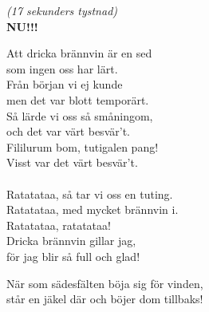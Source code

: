 \documentclass[a6paper, 10pt, twoside]{article}
\begin{document}
\noindent
\begin{center}
    \begin{lyrics}
        \textit{\small(17 sekunders tystnad)}\\
        \Large \textbf{NU!!!}
    \end{lyrics}
\end{center}
\begin{center}
\end{center}
\begin{lyrics}
Att dricka brännvin är en sed \\
som ingen oss har lärt. \\
Från början vi ej kunde \\
men det var blott temporärt. \\
Så lärde vi oss så småningom, \\
och det var värt besvär't. \\
Fililurum bom, tutigalen pang! \\
Visst var det värt besvär't. \\
\vspace{5pt}\\
Ratatataa, så tar vi oss en tuting. \\
Ratatataa, med mycket brännvin i. \\
Ratatataa, ratatataa! \\
Dricka brännvin gillar jag, \\
för jag blir så full och glad! 
\end{lyrics}
\begin{center}
\end{center}
\begin{lyrics}
När som sädesfälten böja sig för vinden, \\
står en jäkel där och böjer dom tillbaks! 
\end{lyrics}
\end{document}
